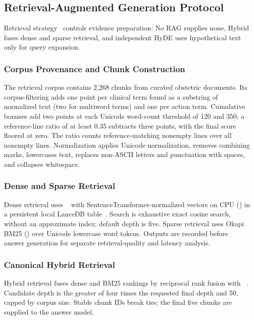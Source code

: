 \subsection{Retrieval-Augmented Generation Protocol}
\label{sec:rag-protocol}
Retrieval strategy~\cite{lewis2020retrieval} controls evidence preparation:
No RAG supplies none, Hybrid fuses dense and sparse retrieval, and
independent HyDE uses hypothetical text only for query expansion.

\subsubsection{Corpus Provenance and Chunk Construction}
The retrieval corpus contains 2,268 chunks from curated obstetric documents.
Its corpus-filtering  adds one point per clinical term
found as a substring of normalized text (two for multiword terms) and one
per action term. Cumulative bonuses add two points at each Unicode word-count
threshold of 120 and 350; a reference-line ratio of at least 0.35 subtracts
three points, with the final score floored at zero. The ratio counts
reference-matching nonempty lines over all nonempty lines. Normalization
applies Unicode normalization, removes combining marks, lowercases text,
replaces non-ASCII letters and punctuation with spaces, and collapses whitespace.

\subsubsection{Dense and Sparse Retrieval}
Dense retrieval uses ~\cite{chen2024bge} with
SentenceTransformer-normalized vectors on CPU () in a
persistent local LanceDB table~\cite{lancedb2026vector}. Search is exhaustive
exact cosine search, without an approximate index; default depth is five.
Sparse retrieval uses Okapi BM25 () over Unicode
lowercase word tokens. Outputs are recorded before answer generation for
separate retrieval-quality and latency analysis.

\subsubsection{Canonical Hybrid Retrieval}
Hybrid retrieval fuses dense and BM25 rankings by reciprocal rank fusion
with ~\cite{cormack2009reciprocal}. Candidate depth
is the greater of four times the requested final depth and 50, capped by
corpus size. Stable chunk IDs break ties; the final five chunks are supplied
to the answer model.

